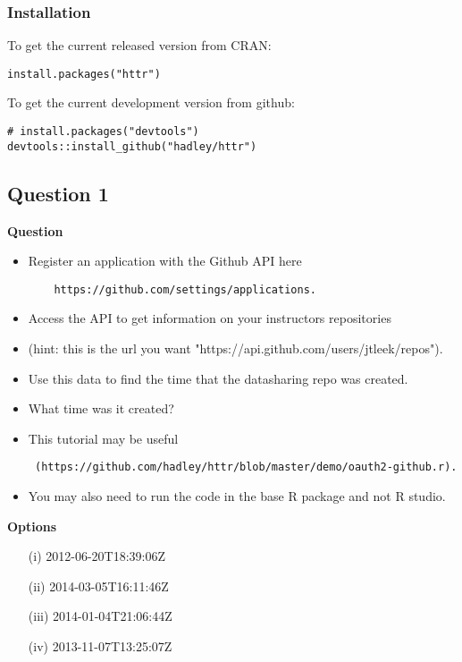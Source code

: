 \documentclass[12pt]{article}
\begin{document}
\newpage
\subsubsection*{Installation}

To get the current released version from CRAN:
\begin{framed}
\begin{verbatim}
install.packages("httr")
\end{verbatim}
\end{framed}
To get the current development version from github:
\begin{framed}
\begin{verbatim}
# install.packages("devtools")
devtools::install_github("hadley/httr")
\end{verbatim}
\end{framed}
\newpage
\subsection*{Question 1}
\textbf{Question}
\begin{itemize}
	\item Register an application with the Github API here 
	\begin{verbatim}
	https://github.com/settings/applications. 
	\end{verbatim}
	\item Access the API to get information on your instructors repositories 
	\item (hint: this is the url you want "https://api.github.com/users/jtleek/repos"). \item Use this data to find the time that the datasharing repo was created. \item What time was it created?
	\item This tutorial may be useful
	\begin{verbatim} (https://github.com/hadley/httr/blob/master/demo/oauth2-github.r).
	\end{verbatim}
	\item You may also need to run the code in the base R package and not R studio.
\end{itemize}

\noindent \textbf{Options} \\
\begin{itemize}
\item[(i)] 2012-06-20T18:39:06Z
\item[(ii)] 2014-03-05T16:11:46Z
\item[(iii)] 2014-01-04T21:06:44Z
\item[(iv)] 2013-11-07T13:25:07Z
\end{itemize}
\newpage
\end{document}
